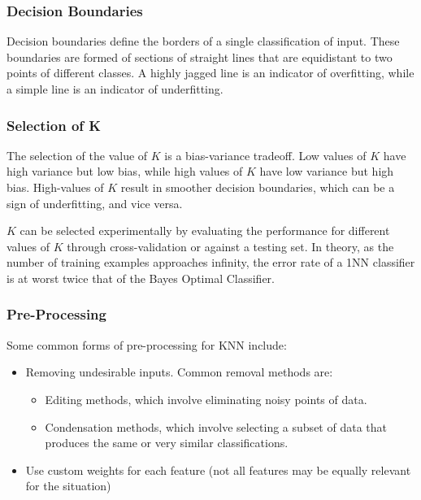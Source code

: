 \documentclass[12pt]{article}
\begin{document}
        \subsubsection{Decision Boundaries}
            Decision boundaries define the borders of a single classification of input. These boundaries are formed of
            sections of straight lines that are equidistant to two points of different classes. A highly jagged line is
            an indicator of overfitting, while a simple line is an indicator of underfitting.

        \subsubsection{Selection of K}
            The selection of the value of $K$ is a bias-variance tradeoff. Low values of $K$ have high variance but low
            bias, while high values of $K$ have low variance but high bias. High-values of $K$ result in smoother
            decision boundaries, which can be a sign of underfitting, and vice versa.

            $K$ can be selected experimentally by evaluating the performance for different values of $K$ through
            cross-validation or against a testing set. In theory, as the number of training examples approaches
            infinity, the error rate of a 1NN classifier is at worst twice that of the Bayes Optimal Classifier.

        \subsubsection{Pre-Processing}
            Some common forms of pre-processing for KNN include:
            \begin{itemize}
              \item Removing undesirable inputs. Common removal methods are:
                \begin{itemize}
                  \item Editing methods, which involve eliminating noisy points of data.
                  \item Condensation methods, which involve selecting a subset of data that produces the same or very
                  similar classifications.
                \end{itemize}
              \item Use custom weights for each feature (not all features may be equally relevant for the situation)
            \end{itemize}
\end{document}
